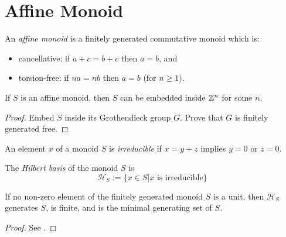 \section{Affine Monoid}


\begin{definition}
  \label{0-affine-monoid}
  \leanok

  An \emph{affine monoid} is a finitely generated commutative monoid which is:
  \begin{itemize}
    \item cancellative: if $a + c = b + c$ then $a = b$, and
    \item torsion-free: if $n a = n b$ then $a = b$ (for $n \geq 1$).
  \end{itemize}
\end{definition}


\begin{proposition}
  \label{0-embed-affine-monoid}

  If $S$ is an affine monoid, then $S$ can be embedded inside ${\mathbb Z}^n$ for some $n$.
\end{proposition}
\begin{proof}
  \uses{}

  Embed $S$ inside its Grothendieck group $G$. Prove that $G$ is finitely generated free.
\end{proof}


\begin{definition}
  \label{0-irred}
  \uses{}

  An element $x$ of a monoid $S$ is \emph{irreducible} if $x = y + z$ implies $y = 0$ or $z = 0$.
\end{definition}


\begin{definition}
  \label{0-hilbert-basis}

  The \emph{Hilbert basis} of the monoid $S$ is
  \[
    \mathcal H_S := \{x \in S | x \text{ is irreducible}\}
  \]
\end{definition}


\begin{proposition}
  \label{0-hilbert-basis-finite}

  If no non-zero element of the finitely generated monoid $S$ is a unit, then $\mathcal H_S$ generates $S$, is finite, and is the minimal generating set of $S$.
\end{proposition}
\begin{proof}
  \uses{}

  See \cite{Cox_2011}.
\end{proof}
